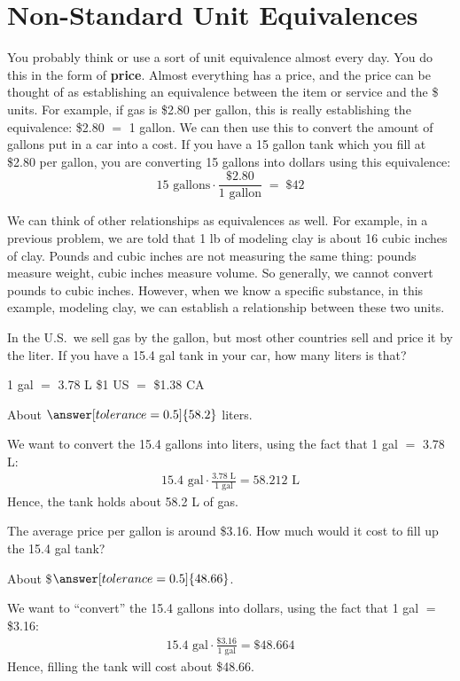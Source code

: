 \documentclass[12pt]{ximera}
\begin{document}
\section*{Non-Standard Unit Equivalences}

You probably think or use a sort of unit equivalence almost every day. You do this in
the form of \textbf{price}. Almost everything has a price, and the price can be thought
of as establishing an equivalence between the item or service and the \$ units. For
example, if gas is \$2.80 per gallon, this is really establishing the equivalence:
\$2.80 $=$ 1 gallon. We can then use this to convert the amount of gallons put in a car
into a cost. If you have a 15 gallon tank which you fill at \$2.80 per gallon, you are
converting 15 gallons into dollars using this equivalence:
\[
15\text{ gallons} \cdot \frac{\$2.80}{1\text{ gallon}} \;=\; \$42
\]

We can think of other relationships as equivalences as well. For example, in a previous
problem, we are told that 1 lb of modeling clay is about 16 cubic inches of clay.
Pounds and cubic inches are not measuring the same thing: pounds measure weight, cubic
inches measure volume. So generally, we cannot convert pounds to cubic inches. However,
when we know a specific substance, in this example, modeling clay, we can establish a
relationship between these two units.

\begin{problem}
In the U.S.\ we sell gas by the gallon, but most other countries sell and price it by
the liter. If you have a 15.4 gal tank in your car, how many liters is that?

\hspace{1em} 1 gal $=$ 3.78 L \qquad \$1 US $=$ \$1.38 CA

About $\answer[tolerance=0.5]{58.2}$ liters.

\begin{solution}
We want to convert the 15.4 gallons into liters, using the fact that 1 gal $=$ 3.78 L:
\begin{gather*}
15.4\text{ gal} \cdot \frac{3.78\text{ L}}{1\text{ gal}} = 58.212\text{ L}
\end{gather*}
Hence, the tank holds about 58.2 L of gas.
\end{solution}
\end{problem}

\begin{problem}
The average price per gallon is around \$3.16. How much would it cost to fill up the
15.4 gal tank?

About \$$\answer[tolerance=0.5]{48.66}$.

\begin{solution}
We want to ``convert'' the 15.4 gallons into dollars, using the fact that 1 gal $=$
\$3.16:
\begin{gather*}
15.4\text{ gal} \cdot \frac{\$3.16}{1\text{ gal}} = \$48.664
\end{gather*}
Hence, filling the tank will cost about \$48.66.
\end{solution}
\end{problem}
\end{document}
